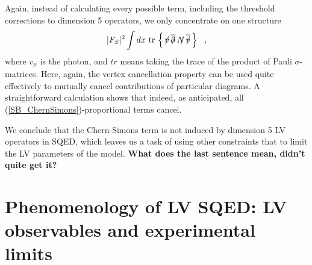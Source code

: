 \documentclass[12pt]{revtex4}
\newcommand{\slashed}[1]{\hbox{{$#1$}\llap{$/$}}}
\begin{document}
Again, instead of calculating every possible term, including the threshold corrections 
to dimension 5 operators, we only concentrate on one structure 
\begin{equation}
\label{SB_ChernSimons}
|F_S|^2 \int dx ~ \mathrm{tr} \,\left\{\, 
      \slashed{v} \, \overline{\slashed{\partial}} \,
      \slashed{N} \, \overline{\slashed{v}} \,
                              \right\}
~~,
\end{equation}
where $ v_\mu $ is the photon, and $ tr $ means
taking the trace of the product of Pauli 
$ \sigma $-matrices.
Here, again, the vertex cancellation property
can be used quite effectively to mutually cancel 
contributions of particular diagrams.
A straightforward calculation shows that indeed,
as anticipated, all (\ref{SB_ChernSimons})-proportional terms cancel.



We conclude that  the Chern-Simons term is not induced
by dimension 5 LV operators in SQED, which leaves us a task of 
    using other constraints that \cite{CFJ} to limit the LV parameters of the model.
{\bf What does the last sentence mean, didn't quite get it?}

\section{Phenomenology of LV SQED: LV observables and experimental limits}
\label{Phenomenology}
\end{document}
